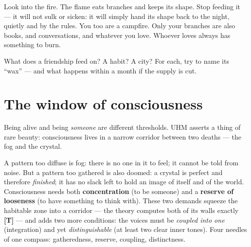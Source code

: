\documentclass[11pt,letterpaper]{article}
\newcommand{\stT}{\textbf{[T]}\xspace}
\begin{document}
\begin{center}
\end{center}

\begin{talebox}
Look into the fire. The flame eats branches and keeps its shape. Stop
feeding it --- it will not sulk or sicken: it will simply hand its
shape back to the night, quietly and by the rules. You too are a
campfire. Only your branches are also books, and conversations, and
whatever you love. Whoever loves always has something to burn.
\end{talebox}

\begin{askbox}
What does a friendship feed on? A habit? A city? For each, try to
name its ``wax'' --- and what happens within a month if the supply is
cut.
\end{askbox}

\section{The window of consciousness}
\label{sec:window}

Being alive and being \emph{someone} are different thresholds. UHM
asserts a thing of rare beauty: consciousness lives in a narrow
corridor between two deaths --- the fog and the crystal.

A pattern too diffuse is fog: there is no one in it to feel; it
cannot be told from noise. But a pattern too gathered is also doomed:
a crystal is perfect and therefore \emph{finished}; it has no slack
left to hold an image of itself and of the world. Consciousness needs
both \textbf{concentration} (to be someone) and a \textbf{reserve of
looseness} (to have something to think with). These two demands
squeeze the habitable zone into a corridor --- the theory computes
both of its walls exactly \stT{} --- and adds two more conditions:
the voices must be \emph{coupled into one} (integration) and yet
\emph{distinguishable} (at least two clear inner tones). Four needles
of one compass: gatheredness, reserve, coupling, distinctness.
\end{document}
